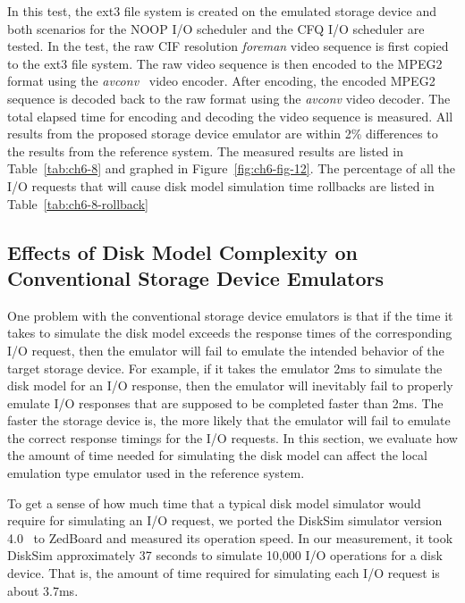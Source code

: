 In this test, the ext3 file system is created on the emulated storage device and both scenarios for the NOOP I/O scheduler and the CFQ I/O scheduler are tested. In the test, the raw CIF resolution \textit{foreman} video sequence is first copied to the ext3 file system. The raw video sequence is then encoded to the MPEG2 format using the \textit{avconv}~\cite{Libav:2014} video encoder. After encoding, the encoded MPEG2 sequence is decoded back to the raw format using the \textit{avconv} video decoder. The total elapsed time for encoding and decoding the video sequence is measured. All results from the proposed storage device emulator are within 2\% differences to the results from the reference system. The measured results are listed in Table~\ref{tab:ch6-8} and graphed in Figure~\ref{fig:ch6-fig-12}. The percentage of all the I/O requests that will cause disk model simulation time rollbacks are listed in Table~\ref{tab:ch6-8-rollback}

\subsection{Effects of Disk Model Complexity on Conventional Storage Device Emulators}

One problem with the conventional storage device emulators is that if the time it takes to simulate the disk model exceeds the response times of the corresponding I/O request, then the emulator will fail to emulate the intended behavior of the target storage device. For example, if it takes the emulator 2\si{\milli\second} to simulate the disk model for an I/O response, then the emulator will inevitably fail to properly emulate I/O responses that are supposed to be completed faster than 2\si{\milli\second}. The faster the storage device is, the more likely that the emulator will fail to emulate the correct response timings for the I/O requests. In this section, we evaluate how the amount of time needed for simulating the disk model can affect the local emulation type emulator used in the reference system.

To get a sense of how much time that a typical disk model simulator would require for simulating an I/O request, we ported the DiskSim simulator version 4.0~\cite{Bucy:2008} to ZedBoard and measured its operation speed. In our measurement, it took DiskSim approximately 37 seconds to simulate 10,000 I/O operations for a disk device. That is, the amount of time required for simulating each I/O request is about 3.7\si{\milli\second}.

